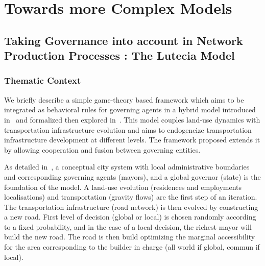 




\chapter{Towards more Complex Models} %

\label{ch:complexmodels} %



\section[The Lutecia Model]{Taking Governance into account in Network Production Processes : The Lutecia Model}


\subsection{Thematic Context}


We briefly describe a simple game-theory based framework which aims to be integrated as behavioral rules for governing agents in a hybrid model introduced in~\cite{le2010approche} and formalized then explored in~\cite{lenechet2012}. This model couples land-use dynamics with transportation infrastructure evolution and aims to endogeneize transportation infrastructure development at different levels. The framework proposed extends it by allowing cooperation and fusion between governing entities.



As detailed in~\cite{lenechet2012}, a conceptual city system with local administrative boundaries and corresponding governing agents (mayors), and a global governor (state) is the foundation of the model. A land-use evolution (residences and employments localisations) and transportation (gravity flows) are the first step of an iteration. The transportation infrastructure (road network) is then evolved by constructing a new road. First level of decision (global or local) is chosen randomly according to a fixed probability, and in the case of a local decision, the richest mayor will build the new road. The road is then build optimizing the marginal accessibility for the area corresponding to the builder in charge (all world if global, commun if local).

